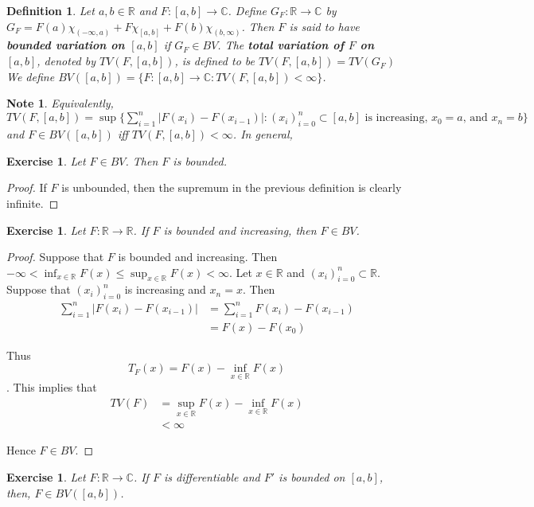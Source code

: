 \documentclass[12pt]{amsart}
\newtheorem{defn}[thm]{Definition}
\newtheorem{note}[thm]{Note}
\newtheorem{ex}[thm]{Exercise}
\newcommand{\C}{\mathbb{C}}
\newcommand{\R}{\mathbb{R}}
\begin{document}
\begin{defn}
Let $a,b \in \R$ and $F:[a,b] \rightarrow \C$. Define $G_F:\R \rightarrow \C$ by $G_F = F(a)\chi_{(-\infty,a)} + F\chi_{[a,b]}+F(b)\chi_{(b,\infty)}$. Then $F$ is said to have \textbf{bounded variation on $[a,b]$} if $G_F \in BV$. The \textbf{total variation of $F$ on $[a,b]$}, denoted by $TV(F, [a,b])$, is defined to be $TV(F, [a,b]) = TV(G_F)$ We define $BV([a,b]) = \{F:[a,b] \rightarrow \C: TV(F, [a,b]) < \infty\}$.
\end{defn}

\begin{note}
Equivalently, $TV(F, [a,b]) = \sup \big \{\sum_{i=1}^{n}|F(x_{i}) - F(x_{i-1})|: (x_i)_{i=0}^n \subset [a,b] \text{ is increasing, } x_0=a \text{, and } x_n=b\big \}$ and $F \in BV([a,b])$ iff $TV(F, [a,b]) < \infty$. In general, 
\end{note}

\begin{ex}
Let $F \in BV$. Then $F$ is bounded.
\end{ex}

\begin{proof}
If $F$ is unbounded, then the supremum in the previous definition is clearly infinite.
\end{proof}

\begin{ex}
Let $F:\R \rightarrow \R$. If $F$ is bounded and increasing, then $F \in BV$.
\end{ex}

\begin{proof}
Suppose that $F$ is bounded and increasing. Then $-\infty<\inf_{x \in \R}F(x) \leq \sup_{x \in \R}F(x)<\infty$. Let $x \in \R$ and $(x_i)_{i=0}^n \subset \R$. Suppose that $(x_i)_{i=0}^n$ is increasing and $x_n=x$. Then 
\begin{align*}
\sum_{i=1}^n|F(x_i)-F(x_{i-1})| 
&= \sum_{i=1}^n F(x_i)-F(x_{i-1})\\
&= F(x)-F(x_0)
\end{align*}

Thus $$T_F(x) = F(x)-\inf_{x \in \R}F(x)$$. This implies that 
\begin{align*}
TV(F) 
&= \sup_{x \in \R}F(x)-\inf_{x \in \R}F(x)\\
&<\infty
\end{align*}

Hence $F \in BV$.
\end{proof}

\begin{ex}
Let $F:\R \rightarrow \C$. If $F$ is differentiable and $F'$ is bounded on $[a,b]$, then, $F \in BV([a,b])$. 
\end{ex}
\end{document}

